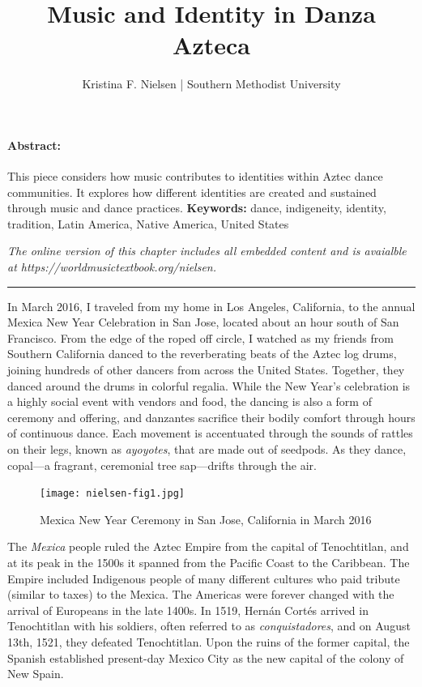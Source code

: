 \documentclass[twoside]{article}
\title{Music and Identity in Danza Azteca}
\author{Kristina F. Nielsen | Southern Methodist University}
\date{}
\makeatletter
\renewcommand{\maketitle}{\bgroup\setlength{\parindent}{0pt}
\begin{flushleft}
  \vspace*{3\baselineskip}
  \huge{\textbf{\@title}}

  \medskip
  
  \large{\@author}
\end{flushleft}\egroup
}
\providecommand{\keywords}[1]
{
  \newline
  \textbf{Keywords:} #1
}
\providecommand{\wmturl}[1]{
  \noindent\emph{The online version of this chapter includes all embedded content and is avaialble at #1.}
}
\makeatother
\begin{document}
\suppressfloats %
\maketitle

\paragraph{Abstract:}
  This piece considers how music contributes to identities within Aztec dance communities. It explores how different identities are created and sustained through music and dance practices.\keywords{dance, indigeneity, identity, tradition, Latin America, Native America, United States}

\smallskip

\wmturl{https://worldmusictextbook.org/nielsen}

\medskip

\noindent\hfil\rule{0.5\textwidth}{0.4pt}\hfil

\bigskip

In March 2016, I traveled from my home in Los Angeles, California, to
the annual Mexica New Year Celebration in San Jose, located about an
hour south of San Francisco. From the edge of the roped off circle, I
watched as my friends from Southern California danced to the
reverberating beats of the Aztec log drums, joining hundreds of other
dancers from across the United States. Together, they danced around the
drums in colorful regalia. While the New Year's celebration is a highly
social event with vendors and food, the dancing is also a form of
ceremony and offering, and danzantes sacrifice their bodily comfort
through hours of continuous dance. Each movement is accentuated through
the sounds of rattles on their legs, known as \emph{ayoyotes}, that are
made out of seedpods. As they dance, copal---a fragrant, ceremonial tree
sap---drifts through the air.

\begin{figure}
  \texttt{[image: nielsen-fig1.jpg]}
  \caption{Mexica New Year Ceremony in San Jose, California in March 2016}
\end{figure}

The \emph{Mexica} people ruled the Aztec Empire from the capital of
Tenochtitlan, and at its peak in the 1500s it spanned from the Pacific
Coast to the Caribbean. The Empire included Indigenous people of many
different cultures who paid tribute (similar to taxes) to the Mexica.
The Americas were forever changed with the arrival of Europeans in the
late 1400s. In 1519, Hernán Cortés arrived in Tenochtitlan with his
soldiers, often referred to as \emph{conquistadores}, and on August
13th, 1521, they defeated Tenochtitlan. Upon the ruins of the former
capital, the Spanish established present-day Mexico City as the new
capital of the colony of New Spain.
\end{document}
